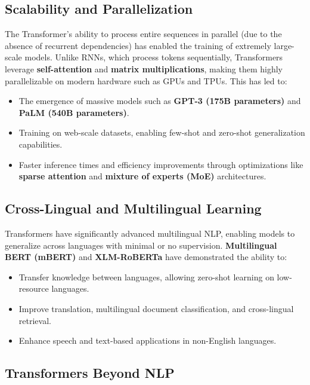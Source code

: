\subsection{Scalability and Parallelization}

The Transformer’s ability to process entire sequences in parallel (due to the absence of recurrent dependencies) has enabled the training of extremely large-scale models. Unlike RNNs, which process tokens sequentially, Transformers leverage \textbf{self-attention} and \textbf{matrix multiplications}, making them highly parallelizable on modern hardware such as GPUs and TPUs. This has led to:

\begin{itemize}
    \item The emergence of massive models such as \textbf{GPT-3 (175B parameters)} and \textbf{PaLM (540B parameters)}.
    \item Training on web-scale datasets, enabling few-shot and zero-shot generalization capabilities.
    \item Faster inference times and efficiency improvements through optimizations like \textbf{sparse attention} and \textbf{mixture of experts (MoE)} architectures.
\end{itemize}

\subsection{Cross-Lingual and Multilingual Learning}

Transformers have significantly advanced multilingual NLP, enabling models to generalize across languages with minimal or no supervision. \textbf{Multilingual BERT (mBERT)} and \textbf{XLM-RoBERTa} have demonstrated the ability to:
\begin{itemize}
    \item Transfer knowledge between languages, allowing zero-shot learning on low-resource languages.
    \item Improve translation, multilingual document classification, and cross-lingual retrieval.
    \item Enhance speech and text-based applications in non-English languages.
\end{itemize}

\subsection{Transformers Beyond NLP}

